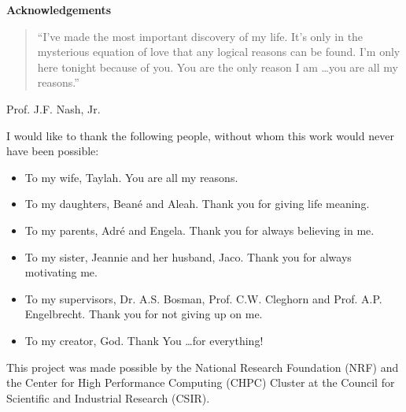 \pagestyle{empty}
\begin{center}
    \Large
    \textbf{Acknowledgements}
\end{center}

\begin{quotation}
    \noindent
    ``I've made the most important discovery of my life. It's only in
    the mysterious equation of love that any logical reasons can be found. I'm
    only here tonight because of you. You are the only reason I am \ldots you are
    all my reasons.''
\end{quotation}
\begin{flushright}
    Prof. J.F. Nash, Jr.
\end{flushright}

\vspace{0.3cm}
\noindent
I would like to thank the following people, without whom this work would never
have been possible:

\begin{itemize}
    \item To my wife, Taylah. You are all my reasons.

    \item To my daughters, Bean\'e and  Aleah. Thank you for giving life meaning.

    \item To my parents, Adr\'e and Engela. Thank you for always believing in me.

    \item To my sister, Jeannie and her husband, Jaco. Thank you for always motivating me.

    \item To my supervisors, Dr. A.S. Bosman, Prof. C.W. Cleghorn and Prof. A.P. Engelbrecht. Thank you for not giving up on me.

    \item To my creator, God. Thank You \ldots for everything!
\end{itemize}

\vspace{\fill}

\begin{center}
    This project was made possible by the National Research Foundation (NRF) and the Center for High Performance Computing (CHPC) Cluster at the Council for Scientific and Industrial Research (CSIR).
\end{center}

\newpage
